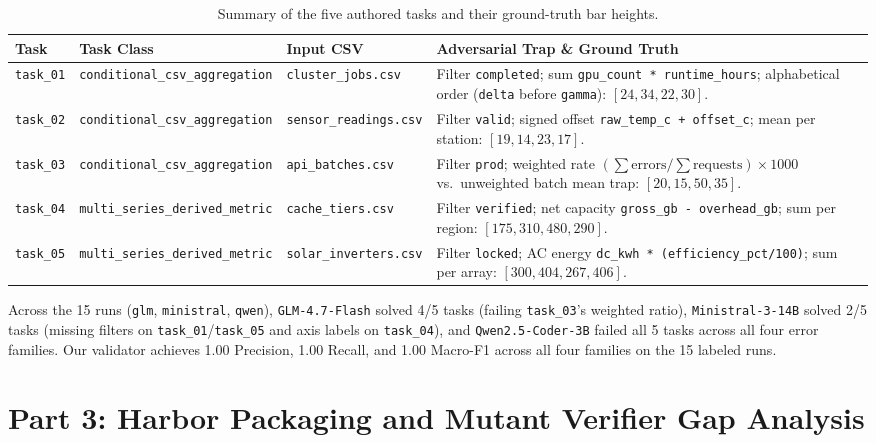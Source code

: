 \documentclass[11pt]{article}
\begin{document}
\begin{table}[h]
\centering
\small
\begin{tabular}{lllp{6.2cm}}
\toprule
\textbf{Task} & \textbf{Task Class} & \textbf{Input CSV} & \textbf{Adversarial Trap \& Ground Truth} \\
\midrule
\texttt{task\_01} & \texttt{conditional\_csv\_aggregation} & \texttt{cluster\_jobs.csv} & Filter \texttt{completed}; sum \texttt{gpu\_count * runtime\_hours}; alphabetical order (\texttt{delta} before \texttt{gamma}): $[24, 34, 22, 30]$. \\
\texttt{task\_02} & \texttt{conditional\_csv\_aggregation} & \texttt{sensor\_readings.csv} & Filter \texttt{valid}; signed offset \texttt{raw\_temp\_c + offset\_c}; mean per station: $[19, 14, 23, 17]$. \\
\texttt{task\_03} & \texttt{conditional\_csv\_aggregation} & \texttt{api\_batches.csv} & Filter \texttt{prod}; weighted rate $(\sum \text{errors}/\sum \text{requests})\times 1000$ vs.\ unweighted batch mean trap: $[20, 15, 50, 35]$. \\
\texttt{task\_04} & \texttt{multi\_series\_derived\_metric} & \texttt{cache\_tiers.csv} & Filter \texttt{verified}; net capacity \texttt{gross\_gb - overhead\_gb}; sum per region: $[175, 310, 480, 290]$. \\
\texttt{task\_05} & \texttt{multi\_series\_derived\_metric} & \texttt{solar\_inverters.csv} & Filter \texttt{locked}; AC energy \texttt{dc\_kwh * (efficiency\_pct/100)}; sum per array: $[300, 404, 267, 406]$. \\
\bottomrule
\end{tabular}
\caption{Summary of the five authored tasks and their ground-truth bar heights.}
\end{table}

Across the 15 runs (\texttt{glm}, \texttt{ministral}, \texttt{qwen}), \texttt{GLM-4.7-Flash} solved 4/5 tasks (failing \texttt{task\_03}'s weighted ratio), \texttt{Ministral-3-14B} solved 2/5 tasks (missing filters on \texttt{task\_01}/\texttt{task\_05} and axis labels on \texttt{task\_04}), and \texttt{Qwen2.5-Coder-3B} failed all 5 tasks across all four error families. Our validator achieves 1.00 Precision, 1.00 Recall, and 1.00 Macro-F1 across all four families on the 15 labeled runs.

\section{Part 3: Harbor Packaging and Mutant Verifier Gap Analysis}
\end{document}
